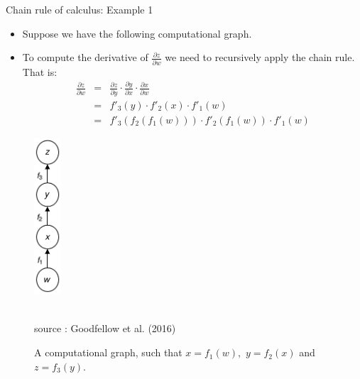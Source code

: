 \begin{vbframe}{Chain rule of calculus: Example 1}
  \begin{minipage}{0.5\textwidth}
    \begin{itemize}
      \item Suppose we have the following computational graph.
      \item To compute the derivative of $\frac{\partial z}{\partial w}$ %
      we need to recursively apply the chain rule. That is:
      \begin{eqnarray*}
        \frac{\partial z}{\partial w} &=& \frac{\partial z}{\partial y} \cdot \frac{\partial y}{\partial x} \cdot \frac{\partial x}{\partial w} \\
                                  &=& f'_3(y) \cdot f'_2(x) \cdot f'_1(w) \\
                                  &=& f'_3(f_2(f_1(w))) \cdot f'_2(f_1(w)) \cdot f'_1(w)
      \end{eqnarray*}
    \end{itemize}
  \end{minipage}\hfill
  \begin{minipage}{0.32\textwidth}
    \begin{figure}
      \centering
        \includegraphics[width=1cm]{plots/compgraph2.png}
        \begin{footnotesize}
        \tiny{\\source : Goodfellow et al. (2016)}
        \caption{A computational graph, such that $x = f_1(w),$ $y = f_2(x)$ and $z = f_3(y)$.}
        \end{footnotesize}
    \end{figure}
  \end{minipage}
\end{vbframe}

